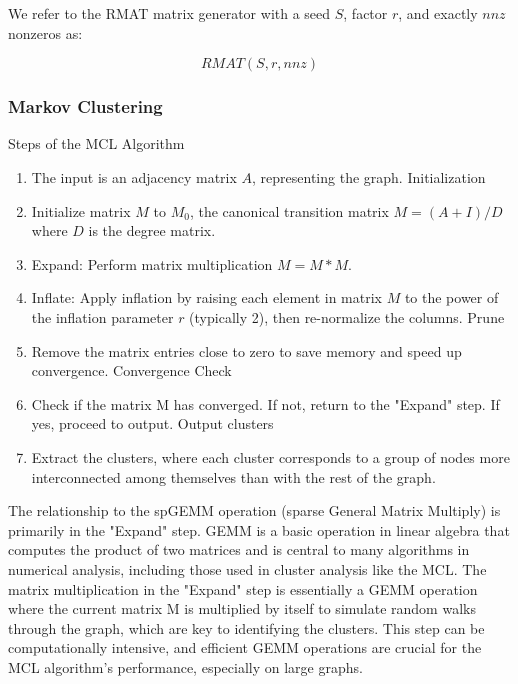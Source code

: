 \documentclass{article}
\newcommand {\hrl}[1]{{\color{cyan}\sf{[Hengrui: #1]}}}
\begin{document}
	We refer to the RMAT matrix generator with a seed $S$, factor $r$, and exactly $nnz$ nonzeros as:

	\[
		RMAT(S, r, nnz)
	\]
\subsubsection{Markov Clustering}
Steps of the MCL Algorithm
\begin{enumerate}

\item The input is an adjacency matrix $A$, representing the graph.
Initialization

\item Initialize matrix $M$ to $M_0$, the canonical transition matrix $M = (A + I) / D$ where $D$ is the degree matrix.


\item Expand: Perform matrix multiplication $M = M * M$.


\item Inflate: Apply inflation by raising each element in matrix $M$ to the power of the inflation parameter $r$ (typically 2), then re-normalize the columns.
Prune

\item Remove the matrix entries close to zero to save memory and speed up convergence.
Convergence Check

\item Check if the matrix M has converged. If not, return to the "Expand" step. If yes, proceed to output.
Output clusters

\item Extract the clusters, where each cluster corresponds to a group of nodes more interconnected among themselves than with the rest of the graph.
     
\end{enumerate}
The relationship to the spGEMM operation (sparse General Matrix Multiply) is primarily in the "Expand" step. GEMM is a basic operation in linear algebra that computes the product of two matrices and is central to many algorithms in numerical analysis, including those used in cluster analysis like the MCL. The matrix multiplication in the "Expand" step is essentially a GEMM operation where the current matrix M is multiplied by itself to simulate random walks through the graph, which are key to identifying the clusters. This step can be computationally intensive, and efficient GEMM operations are crucial for the MCL algorithm's performance, especially on large graphs.
\end{document}
